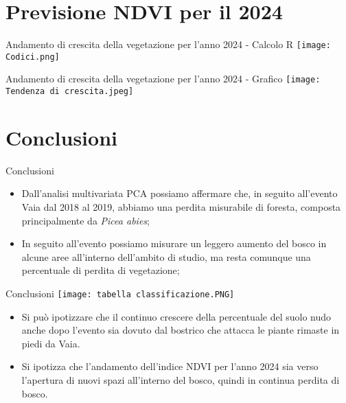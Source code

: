 \documentclass[10pt]{beamer}
\begin{document}
\section{Previsione NDVI per il 2024}
\begin{frame}{Andamento di crescita della vegetazione per l'anno 2024 - Calcolo R }
\centering
\texttt{[image: Codici.png]}
\end{frame}
\begin{frame}{Andamento di crescita della vegetazione per l'anno 2024 - Grafico}
\centering
\texttt{[image: Tendenza di crescita.jpeg]}
\end{frame}

\section{Conclusioni}
\begin{frame}{Conclusioni}
\begin{itemize}
    \item Dall'analisi multivariata PCA possiamo affermare che, in seguito all'evento Vaia dal 2018 al 2019, abbiamo una perdita misurabile di foresta, composta principalmente da \textit{Picea abies};
    \item In seguito all'evento possiamo misurare un leggero aumento del bosco in alcune aree all'interno dell'ambito di studio, ma resta comunque una percentuale di perdita di vegetazione;
\end{itemize}
\end{frame}

\begin{frame}{Conclusioni}
\centering
\texttt{[image: tabella classificazione.PNG]} 
\begin{itemize}
    \item Si può ipotizzare che il continuo crescere della percentuale del suolo nudo anche dopo l'evento sia dovuto dal bostrico che attacca le piante rimaste in piedi da Vaia. 
     \item Si ipotizza che l'andamento dell'indice NDVI per l'anno 2024 sia verso l'apertura di nuovi spazi all'interno del bosco, quindi in continua perdita di bosco. 
\end{itemize} 
\end{frame}
\end{document}
